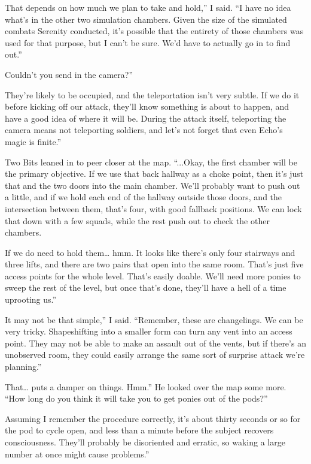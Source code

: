 \leavevmode{}That depends on how much we plan to take and hold,” I said. “I have no idea what’s in the other two simulation chambers. Given the size of the simulated combats Serenity conducted, it’s possible that the entirety of those chambers was used for that purpose, but I can’t be sure. We’d have to actually go in to find out.”

\leavevmode{}Couldn’t you send in the camera?”

\leavevmode{}They’re likely to be occupied, and the teleportation isn’t very subtle. If we do it before kicking off our attack, they’ll know something is about to happen, and have a good idea of where it will be. During the attack itself, teleporting the camera means not teleporting soldiers, and let’s not forget that even Echo’s magic is finite.”

Two Bits leaned in to peer closer at the map. “...Okay, the first chamber will be the primary objective. If we use that back hallway as a choke point, then it’s just that and the two doors into the main chamber. We’ll probably want to push out a little, and if we hold each end of the hallway outside those doors, and the intersection between them, that’s four, with good fallback positions. We can lock that down with a few squads, while the rest push out to check the other chambers.

\leavevmode{}If we do need to hold them… hmm. It looks like there’s only four stairways and three lifts, and there are two pairs that open into the same room. That’s just five access points for the whole level. That’s easily doable. We’ll need more ponies to sweep the rest of the level, but once that’s done, they’ll have a hell of a time uprooting us.”

\leavevmode{}It may not be that simple,” I said. “Remember, these are changelings. We can be very tricky. Shapeshifting into a smaller form can turn any vent into an access point. They may not be able to make an assault out of the vents, but if there’s an unobserved room, they could easily arrange the same sort of surprise attack we’re planning.”

\leavevmode{}That… puts a damper on things. Hmm.” He looked over the map some more. “How long do you think it will take you to get ponies out of the pods?”

\leavevmode{}Assuming I remember the procedure correctly, it’s about thirty seconds or so for the pod to cycle open, and less than a minute before the subject recovers consciousness. They’ll probably be disoriented and erratic, so waking a large number at once might cause problems.”


